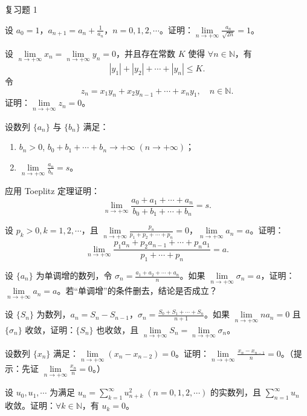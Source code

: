 \begin{exblock}{复习题 1}
    \item 设 $a_0 = 1$，$a_{n+1} = a_n + \frac{1}{a_n}$，$n = 0, 1, 2, \cdots$。证明：$\lim\limits_{n\to+\infty} \frac{a_n}{\sqrt{2n}} = 1$。

    \item 设 $\lim\limits_{n\to+\infty} x_n = \lim\limits_{n\to+\infty} y_n = 0$，并且存在常数 $K$ 使得 $\forall n \in \mathbb{N}$，有
    \[
    |y_1| + |y_2| + \cdots + |y_n| \leqslant K.
\]
    令
    \[
    z_n = x_1 y_n + x_2 y_{n-1} + \cdots + x_n y_1,\quad n \in \mathbb{N}.
\]
    证明：$\lim\limits_{n\to+\infty} z_n = 0$。

    \item 设数列 $\{a_n\}$ 与 $\{b_n\}$ 满足：
    \begin{enumerate}
        \item $b_n > 0$, $b_0 + b_1 + \cdots + b_n \to +\infty\; (n \to +\infty)$；
        \item $\lim\limits_{n\to+\infty} \frac{a_n}{b_n} = s$。
    \end{enumerate}
    应用 Toeplitz 定理证明：
    \[
    \lim_{n\to+\infty} \frac{a_0 + a_1 + \cdots + a_n}{b_0 + b_1 + \cdots + b_n} = s.
\]

    \item 设 $p_k > 0, k = 1, 2, \cdots$，且 $\lim\limits_{n\to+\infty} \frac{p_n}{p_1 + p_2 + \cdots + p_n} = 0$，$\lim\limits_{n\to+\infty} a_n = a$。证明：
    \[
    \lim_{n\to+\infty} \frac{p_1 a_n + p_2 a_{n-1} + \cdots + p_n a_1}{p_1 + \cdots + p_n} = a.
\]

    \item 设 $\{a_n\}$ 为单调增的数列，令 $\sigma_n = \frac{a_1 + a_2 + \cdots + a_n}{n}$。如果 $\lim\limits_{n\to+\infty} \sigma_n = a$，证明：$\lim\limits_{n\to+\infty} a_n = a$。若“单调增”的条件删去，结论是否成立？

    \item 设 $\{S_n\}$ 为数列，$a_n = S_n - S_{n-1}$，$\sigma_n = \frac{S_0 + S_1 + \cdots + S_n}{n+1}$。如果 $\lim\limits_{n\to+\infty} n a_n = 0$ 且 $\{\sigma_n\}$ 收敛，证明：$\{S_n\}$ 也收敛，且 $\lim\limits_{n\to+\infty} S_n = \lim\limits_{n\to+\infty} \sigma_n$。

    \item 设数列 $\{x_n\}$ 满足：$\lim\limits_{n\to+\infty} (x_n - x_{n-2}) = 0$。证明：$\lim\limits_{n\to+\infty} \frac{x_n - x_{n-1}}{n} = 0$。（提示：先证 $\lim\limits_{n\to+\infty} \frac{x_n}{n} = 0$。）

    \item 设 $u_0, u_1, \cdots$ 为满足 $u_n = \sum\limits_{k=1}^\infty u_{n+k}^2\; (n = 0, 1, 2, \cdots)$ 的实数列，且 $\sum\limits_{n=1}^\infty u_n$ 收敛。证明：$\forall k \in \mathbb{N}$，有 $u_k = 0$。


\end{exblock}
